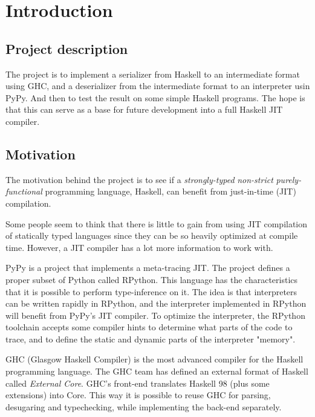 
\section{Introduction}

\subsection{Project description}

The project is to implement a serializer from Haskell to an intermediate
format using GHC, and a deserializer from the intermediate format to an
interpreter usin PyPy. And then to test the result on some simple Haskell
programs. The hope is that this can serve as a base for future development
into a full Haskell JIT compiler.

\subsection{Motivation}

The motivation behind the project is to see if a \emph{strongly-typed} 
\emph{non-strict} \emph{purely-functional} programming language, Haskell, 
can benefit from just-in-time (JIT) compilation.

Some people seem to think that there is little to gain from using 
JIT compilation of statically typed languages since they can be
so heavily optimized at compile time. However, a JIT compiler has a lot
more information to work with.

PyPy is a project that implements a meta-tracing JIT. The project
defines a proper subset of Python called RPython. This language has 
the characteristics that it is possible to perform type-inference on it.
The idea is that interpreters can be written rapidly in RPython, and the
interpreter implemented in RPython will benefit from PyPy's JIT compiler.
To optimize the interpreter, the RPython toolchain accepts some compiler
hints to determine what parts of the code to trace, and to define the 
static and dynamic parts of the interpreter "memory".

GHC (Glasgow Haskell Compiler) is the most advanced compiler for the
Haskell programming language. The GHC team has defined an external format
of Haskell called \emph{External Core}. GHC's front-end translates
Haskell 98 (plus some extensions) into Core. This way it is possible to
reuse GHC for parsing, desugaring and typechecking, while implementing
the back-end separately. \cite{tolmach2010ghc}

